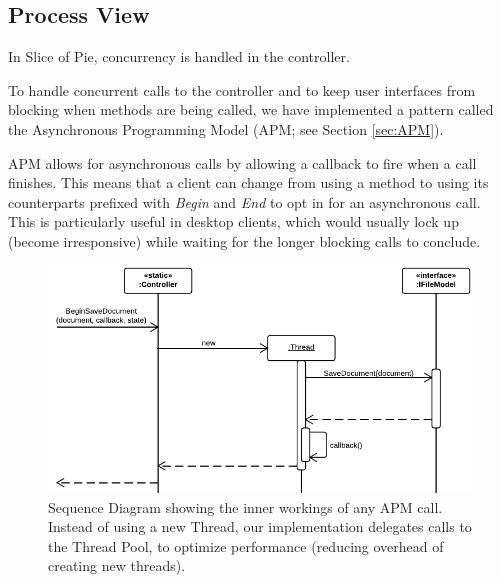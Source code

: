 \subsection{Process View}

In Slice of Pie, concurrency is handled in the controller.

To handle concurrent calls to the controller and to keep user interfaces from blocking when methods
are being called, we have implemented a pattern called the Asynchronous Programming Model (APM; see
Section \ref{sec:APM}).

APM allows for asynchronous calls by allowing a callback to fire when a call finishes. This means that
a client can change from using a method to using its counterparts prefixed with \emph{Begin} and
\emph{End} to opt in for an asynchronous call. This is particularly useful in desktop clients, which
would usually lock up (become irresponsive) while waiting for the longer blocking calls to conclude.

\begin{figure}[htb]
	\centering
	\includegraphics[width=1\textwidth]{Software_architecture/graphics/apm-sequence.png}
	\caption{Sequence Diagram showing the inner workings of any APM call. Instead of using a new Thread, our implementation
        delegates calls to the Thread Pool, to optimize performance (reducing overhead of creating new threads).}
	\label{fig:apm-sequence}
\end{figure}